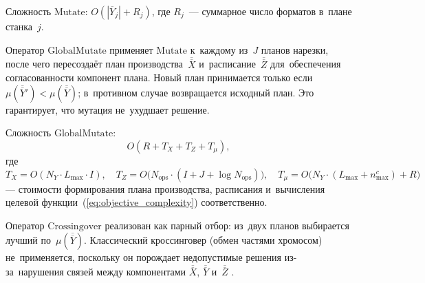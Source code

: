 \begin{center}
\label{alg:mutate}
\end{center}

Сложность $\mathrm{Mutate}$: $O(|\overline{Y}_j|+R_j)$, где $R_j$~--- суммарное число форматов в~плане станка~$j$.

Оператор $\mathrm{GlobalMutate}$ применяет $\mathrm{Mutate}$ к~каждому из~$J$ планов нарезки, после чего пересоздаёт план производства~$\overline{\overline{X}}$ и~расписание~$\overline{\overline{Z}}$ для~обеспечения согласованности компонент плана.
Новый план принимается только если $\mu(\overline{\overline{Y}}')<\mu(\overline{\overline{Y}})$; в~противном случае возвращается исходный план.
Это гарантирует, что мутация не~ухудшает решение.

\begin{center}
\resizebox{!}{0.8\textheight}{%
    
}
\label{alg:global_mutate}
\end{center}

Сложность $\mathrm{GlobalMutate}$:
\[
O(R + T_X + T_Z + T_\mu),
\]
где
\[
T_X=O(N_Y\cdot L_{\max}\cdot I),\quad T_Z=O\bigl(N_{\mathrm{ops}}\cdot(I+J+\log N_{\mathrm{ops}})\bigr),\quad T_\mu=O\bigl(N_Y\cdot(L_{\max}+n^c_{\max})+R\bigr)
\]
--- стоимости формирования плана производства, расписания и~вычисления целевой функции~(\eqref{eq:objective_complexity}) соответственно.

Оператор $\mathrm{Crossingover}$ реализован как парный отбор: из~двух планов выбирается лучший по~$\mu(\overline{\overline{Y}})$.
Классический кроссинговер (обмен частями хромосом) не~применяется, поскольку он порождает недопустимые решения из-за~нарушения связей между компонентами $\overline{\overline{X}}$, $\overline{\overline{Y}}$ и~$\overline{\overline{Z}}$ \cite{kureichik1998,genetics_2}.

